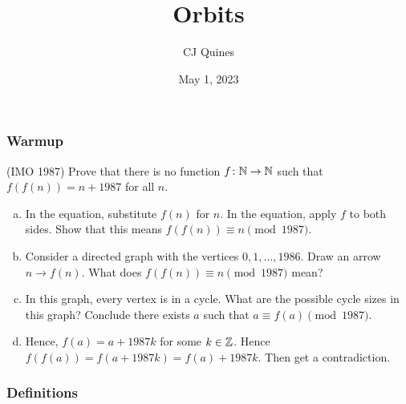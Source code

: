 \documentclass[11pt,paper=letter]{scrartcl}
\begin{document}
\title{Orbits}
\author{CJ Quines}
\date{May 1, 2023}

\maketitle

\subsubsection*{Warmup}

(IMO 1987) Prove that there is no function $f \colon \mathbb N \to \mathbb N$ such that $f(f(n))=n+1987$ for all $n$.
\begin{enumerate}[(a)]
\item In the equation, substitute $f(n)$ for $n$. In the equation, apply $f$ to both sides. Show that this means $f(f(n)) \equiv n \pmod{1987}$.
\item Consider a directed graph with the vertices $0, 1, \ldots, 1986$. Draw an arrow $n \to f(n)$. What does $f(f(n)) \equiv n \pmod{1987}$ mean?
\item In this graph, every vertex is in a cycle. What are the possible cycle sizes in this graph? Conclude there exists $a$ such that $a \equiv f(a) \pmod{1987}$.
\item Hence, $f(a) = a + 1987k$ for some $k \in \mathbb Z$. Hence $f(f(a)) = f(a + 1987k) = f(a) + 1987k$. Then get a contradiction.
\end{enumerate}

\subsubsection*{Definitions}
\end{document}

